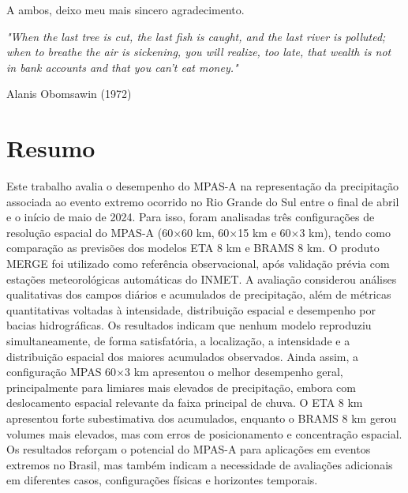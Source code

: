 \documentclass[12pt,a4paper,oneside]{book}
\begin{document}
A ambos, deixo meu mais sincero agradecimento.

\clearpage
\thispagestyle{empty}
\vspace*{\fill}
\begin{flushright}
\begin{minipage}{0.68\textwidth}
\raggedleft
\textit{"When the last tree is cut, the last fish is caught, and the last river is polluted; when to breathe the air is sickening, you will realize, too late, that wealth is not in bank accounts and that you can’t eat money."}\footnotemark

\medskip

Alanis Obomsawin (1972)
\end{minipage}
\end{flushright}
\clearpage

\chapter*{Resumo}
Este trabalho avalia o desempenho do MPAS-A na representação da precipitação associada ao evento extremo ocorrido no Rio Grande do Sul entre o final de abril e o início de maio de 2024. Para isso, foram analisadas três configurações de resolução espacial do MPAS-A (60$\times$60 km, 60$\times$15 km e 60$\times$3 km), tendo como comparação as previsões dos modelos ETA 8 km e BRAMS 8 km. O produto MERGE foi utilizado como referência observacional, após validação prévia com estações meteorológicas automáticas do INMET. A avaliação considerou análises qualitativas dos campos diários e acumulados de precipitação, além de métricas quantitativas voltadas à intensidade, distribuição espacial e desempenho por bacias hidrográficas. Os resultados indicam que nenhum modelo reproduziu simultaneamente, de forma satisfatória, a localização, a intensidade e a distribuição espacial dos maiores acumulados observados. Ainda assim, a configuração MPAS 60$\times$3 km apresentou o melhor desempenho geral, principalmente para limiares mais elevados de precipitação, embora com deslocamento espacial relevante da faixa principal de chuva. O ETA 8 km apresentou forte subestimativa dos acumulados, enquanto o BRAMS 8 km gerou volumes mais elevados, mas com erros de posicionamento e concentração espacial. Os resultados reforçam o potencial do MPAS-A para aplicações em eventos extremos no Brasil, mas também indicam a necessidade de avaliações adicionais em diferentes casos, configurações físicas e horizontes temporais.
\end{document}
